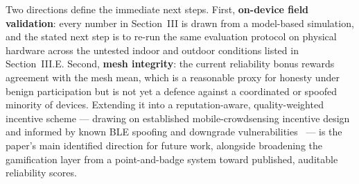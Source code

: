 \documentclass[journal,10pt]{IEEEtran}
\begin{document}
Two directions define the immediate next steps. First, \textbf{on-device
field validation}: every number in Section~III is drawn from a model-based
simulation, and the stated next step is to re-run the same evaluation
protocol on physical hardware across the untested indoor and outdoor
conditions listed in Section~III.E. Second, \textbf{mesh integrity}: the
current reliability bonus rewards agreement with the mesh mean, which is a
reasonable proxy for honesty under benign participation but is not yet a
defence against a coordinated or spoofed minority of devices. Extending it
into a reputation-aware, quality-weighted incentive scheme --- drawing on
established mobile-crowdsensing incentive design~\cite{zhang2022,wang2018}
and informed by known BLE spoofing and downgrade
vulnerabilities~\cite{casar2022,antonioli2020,cai2024} --- is the paper's
main identified direction for future work, alongside broadening the
gamification layer from a point-and-badge system toward published, auditable
reliability scores.
\end{document}
